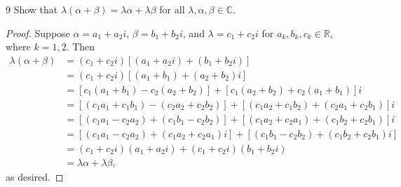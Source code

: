 \documentclass{extarticle}
\newenvironment{problem}[1]{\begin{prob*}{#1}{}}{\end{prob*}}
\newcommand{\R}{\mathbb{R}}
\newcommand{\C}{\mathbb{C}}
\begin{document}
\begin{problem}{9}
Show that $\lambda(\alpha+\beta) = \lambda\alpha + \lambda\beta$ for all $\lambda,\alpha,\beta\in\C$.
\end{problem}
\begin{proof}
Suppose $\alpha = a_1 + a_2i$, $\beta = b_1 + b_2i$, and $\lambda = c_1+c_2i$ for $a_k, b_k, c_k\in\R$, where $k=1,2$.  Then
\begin{align*}
\lambda(\alpha+\beta) &= (c_1 + c_2i)\left[(a_1 + a_2i) + (b_1 + b_2i)\right]\\
				  &= (c_1 + c_2i)\left[(a_1 + b_1) + (a_2 + b_2)i\right]\\
				  &= \left[c_1(a_1 + b_1) - c_2(a_2 + b_2)\right] + \left[c_1(a_2 + b_2) + c_2(a_1 + b_1)\right]i\\
				  &= \left[(c_1a_1 + c_1b_1) - (c_2a_2 + c_2b_2) \right] + \left[(c_1a_2 + c_1b_2) + (c_2a_1 + c_2b_1)\right]i \\
				  &= \left[(c_1a_1 - c_2a_2) + (c_1b_1 - c_2b_2)\right] + \left[(c_1a_2 + c_2a_1) + (c_1b_2 + c_2b_1)\right]i \\
				  &= \left[(c_1a_1 - c_2a_2) + (c_1a_2 + c_2a_1)i\right] + \left[(c_1b_1 - c_2b_2) +  (c_1b_2 + c_2b_1)i\right] \\
				  &= (c_1 + c_2i)(a_1 + a_2i) + (c_1 + c_2i)(b_1 + b_2i)\\
				  &= \lambda\alpha + \lambda\beta,
\end{align*}
as desired.
\end{proof}
\end{document}
